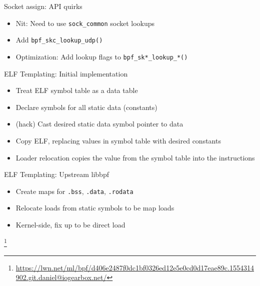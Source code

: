 \documentclass[black,white]{beamer}
\newcommand\blfootnote[1]{%
  \begingroup
  \renewcommand\thefootnote{}\footnote{#1}%
  \addtocounter{footnote}{-1}%
  \endgroup
}
\DeclareRobustCommand{\#}{\adjustbox{valign=B,totalheight=.57\baselineskip}{\oldhash}}%
\newcommand{\backupend}{
   \setcounter{framenumber}{\value{finalframe}}
}
\begin{document}
    \begin{frame}[fragile]{Socket assign: API quirks}
        \centering
        \begin{itemize}
            \item Nit: Need to use \verb+sock_common+ socket lookups \medskip
            \item Add \verb+bpf_skc_lookup_udp()+ \medskip
            \item Optimization: Add lookup flags to \verb+bpf_sk*_lookup_*()+ \medskip
        \end{itemize}
    \end{frame}

    \begin{frame}{ELF Templating: Initial implementation}
        \begin{itemize}
            \item Treat ELF symbol table as a data table \medskip
            \item Declare symbols for all static data (constants) \medskip
            \item (hack) Cast desired static data symbol pointer to data \medskip
            \item Copy ELF, replacing values in symbol table with desired constants \medskip
            \item Loader relocation copies the value from the symbol table into the instructions \medskip
        \end{itemize}
    \end{frame}

    \begin{frame}[fragile]{ELF Templating: Upstream libbpf}
        \begin{itemize}
            \item Create maps for \verb+.bss+, \verb+.data+, \verb+.rodata+ \medskip
            \item Relocate loads from static symbols to be map loads \medskip
            \item Kernel-side, fix up to be direct load \medskip
        \end{itemize}
        \blfootnote{\tiny \url{https://lwn.net/ml/bpf/d406e2487f0dc1bf0326ed12e5e0cd0d17eae89c.1554314902.git.daniel@iogearbox.net/}}
    \end{frame}
    \backupend
\end{document}
